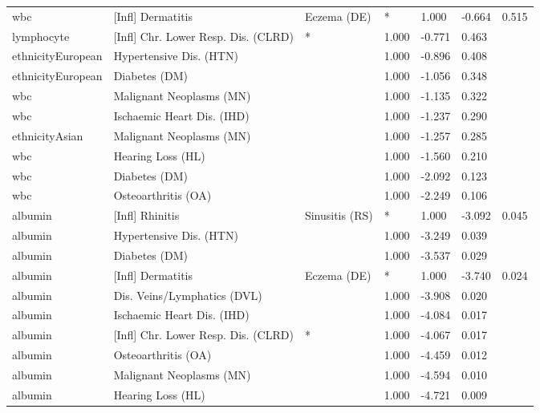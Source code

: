 \begin{tabular}{llllll}
  wbc & [Infl] Dermatitis & Eczema (DE) & * & 1.000 & -0.664 & 0.515 \\ 
  lymphocyte & [Infl] Chr. Lower Resp. Dis. (CLRD) & * & 1.000 & -0.771 & 0.463 \\ 
  ethnicityEuropean & Hypertensive Dis. (HTN) &  & 1.000 & -0.896 & 0.408 \\ 
  ethnicityEuropean & Diabetes (DM) &  & 1.000 & -1.056 & 0.348 \\ 
  wbc & Malignant Neoplasms (MN) &  & 1.000 & -1.135 & 0.322 \\ 
  wbc & Ischaemic Heart Dis. (IHD) &  & 1.000 & -1.237 & 0.290 \\ 
  ethnicityAsian & Malignant Neoplasms (MN) &  & 1.000 & -1.257 & 0.285 \\ 
  wbc & Hearing Loss (HL) &  & 1.000 & -1.560 & 0.210 \\ 
  wbc & Diabetes (DM) &  & 1.000 & -2.092 & 0.123 \\ 
  wbc & Osteoarthritis (OA) &  & 1.000 & -2.249 & 0.106 \\ 
  albumin & [Infl] Rhinitis & Sinusitis (RS) & * & 1.000 & -3.092 & 0.045 \\ 
  albumin & Hypertensive Dis. (HTN) &  & 1.000 & -3.249 & 0.039 \\ 
  albumin & Diabetes (DM) &  & 1.000 & -3.537 & 0.029 \\ 
  albumin & [Infl] Dermatitis & Eczema (DE) & * & 1.000 & -3.740 & 0.024 \\ 
  albumin & Dis. Veins/Lymphatics (DVL) &  & 1.000 & -3.908 & 0.020 \\ 
  albumin & Ischaemic Heart Dis. (IHD) &  & 1.000 & -4.084 & 0.017 \\ 
  albumin & [Infl] Chr. Lower Resp. Dis. (CLRD) & * & 1.000 & -4.067 & 0.017 \\ 
  albumin & Osteoarthritis (OA) &  & 1.000 & -4.459 & 0.012 \\ 
  albumin & Malignant Neoplasms (MN) &  & 1.000 & -4.594 & 0.010 \\ 
  albumin & Hearing Loss (HL) &  & 1.000 & -4.721 & 0.009 \\ 
   \hline
\end{tabular}

